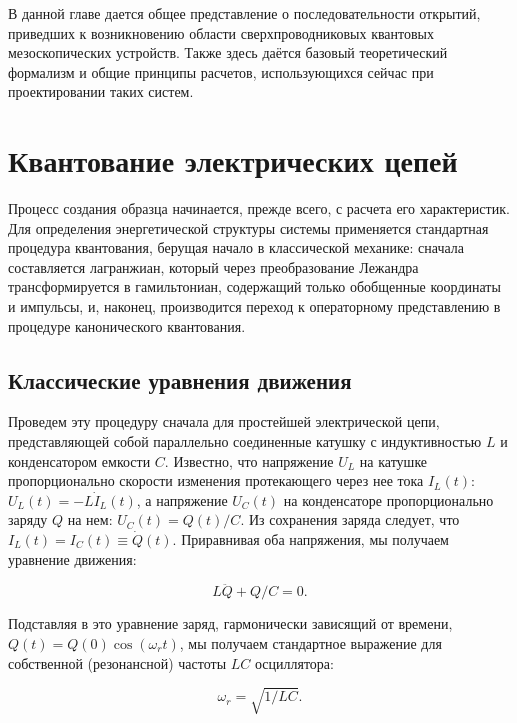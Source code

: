 \documentclass[14pt, a4paper]{extreport}
\numberwithin{equation}{section}
\begin{document}
В данной главе дается общее представление о последовательности открытий, приведших к возникновению области сверхпроводниковых квантовых мезоскопических устройств. Также здесь даётся базовый теоретический формализм и общие принципы расчетов, использующихся сейчас при проектировании таких систем. 

\section{Квантование электрических цепей}\label{sec:circuit_quantization}


Процесс создания образца начинается, прежде всего, с расчета его характеристик. Для определения энергетической структуры системы применяется стандартная процедура квантования, берущая начало в классической механике: сначала составляется лагранжиан, который через преобразование Лежандра трансформируется в гамильтониан, содержащий только обобщенные координаты и импульсы, и, наконец, производится переход к операторному представлению в процедуре канонического квантования. 

\subsection{Классические уравнения движения}


Проведем эту процедуру сначала для простейшей электрической цепи, представляющей собой параллельно соединенные катушку с индуктивностью $L$ и конденсатором емкости $C$. Известно, что напряжение $U_L$ на катушке пропорционально скорости изменения протекающего через нее тока $I_L(t)$: $U_L(t) = - L \dot I_L(t)$, а напряжение $U_C(t)$ на конденсаторе пропорционально заряду $Q$ на нем: $U_C(t) = Q(t)/C$. Из сохранения заряда следует, что $I_L(t) = I_C(t) \equiv \dot Q(t)$. Приравнивая оба напряжения, мы получаем уравнение движения:

\begin{equation}
L \ddot Q + Q/C = 0.
\end{equation}

Подставляя в это уравнение заряд, гармонически зависящий от времени, $Q(t) = Q(0) \cos(\omega_r t)$, мы получаем стандартное выражение для собственной (резонансной) частоты $LC$ осциллятора:

\begin{equation}
	\omega_r = \sqrt{1/LC}.
\end{equation}
\end{document}
